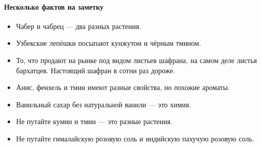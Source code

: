 \paragraph{Несколько фактов на заметку}
\begin{itemize}
\item  Чабер и чабрец — два разных растения.
\item  Узбекские лепёшки посыпают кунжутом и чёрным тмином.
\item То, что продают на рынке под видом листьев шафрана, на самом деле листья бархатцев. Настоящий шафран в сотни раз дороже.
\item Анис, фенхель и тмин имеют разные свойства, но похожие ароматы.
\item Ванильный сахар без натуральной ванили — это химия.
\item Не путайте кумин и тмин — это разные растения.
\item Не путайте гималайскую розовую соль и индийскую пахучую розовую соль.
\end{itemize}

